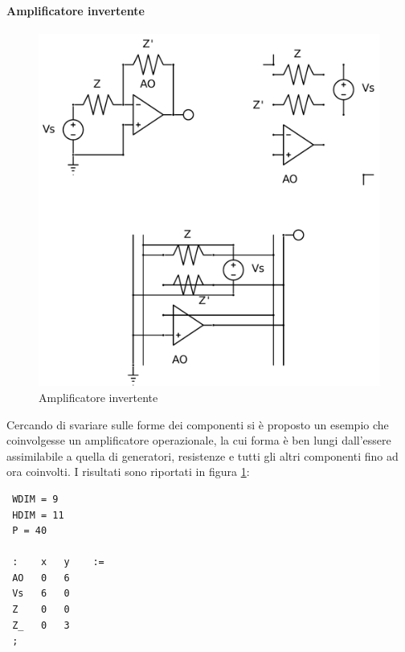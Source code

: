 \paragraph{Amplificatore invertente}
\begin{figure}[ht]
 \centering
 \includegraphics[scale=0.5]{immagini/amplinv.pdf}
 \caption{Amplificatore invertente}
 \label{amplinv}
\end{figure}
Cercando di svariare sulle forme dei componenti si è proposto un esempio che coinvolgesse un amplificatore operazionale, la cui forma è ben lungi dall'essere assimilabile a quella di generatori, resistenze e tutti gli altri componenti fino ad ora coinvolti. I risultati sono riportati in figura \ref{amplinv}:
\small
\begin{verbatim}
 WDIM = 9
 HDIM = 11
 P = 40

 :    x   y    :=
 AO   0   6
 Vs   6   0
 Z    0   0
 Z_   0   3
 ;
\end{verbatim}
\normalsize

